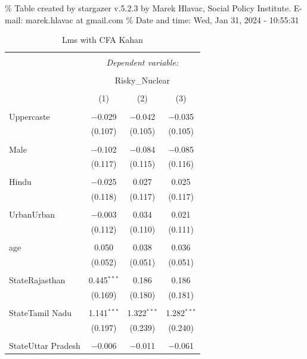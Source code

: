 \documentclass[
]{article}
\begin{document}
\begingroup\setlength{\tabcolsep}{1pt}

\renewcommand{\arraystretch}{0.7}

\% Table created by stargazer v.5.2.3 by Marek Hlavac, Social Policy
Institute. E-mail: marek.hlavac at gmail.com \% Date and time: Wed, Jan
31, 2024 - 10:55:31

\begin{table}[!htbp] \centering 
  \caption{Lms with CFA Kahan} 
  \label{} 
\begin{tabular}{@{\extracolsep{5pt}}lccc} 
\\[-1.8ex]\hline 
\hline \\[-1.8ex] 
 & \multicolumn{3}{c}{\textit{Dependent variable:}} \\ 
\cline{2-4} 
\\[-1.8ex] & \multicolumn{3}{c}{Risky\_Nuclear} \\ 
\\[-1.8ex] & (1) & (2) & (3)\\ 
\hline \\[-1.8ex] 
 Uppercaste & $-$0.029 & $-$0.042 & $-$0.035 \\ 
  & (0.107) & (0.105) & (0.105) \\ 
  & & & \\ 
 Male & $-$0.102 & $-$0.084 & $-$0.085 \\ 
  & (0.117) & (0.115) & (0.116) \\ 
  & & & \\ 
 Hindu & $-$0.025 & 0.027 & 0.025 \\ 
  & (0.118) & (0.117) & (0.117) \\ 
  & & & \\ 
 UrbanUrban & $-$0.003 & 0.034 & 0.021 \\ 
  & (0.112) & (0.110) & (0.111) \\ 
  & & & \\ 
 age & 0.050 & 0.038 & 0.036 \\ 
  & (0.052) & (0.051) & (0.051) \\ 
  & & & \\ 
 StateRajasthan & 0.445$^{***}$ & 0.186 & 0.186 \\ 
  & (0.169) & (0.180) & (0.181) \\ 
  & & & \\ 
 StateTamil Nadu & 1.141$^{***}$ & 1.322$^{***}$ & 1.282$^{***}$ \\ 
  & (0.197) & (0.239) & (0.240) \\ 
  & & & \\ 
 StateUttar Pradesh & $-$0.006 & $-$0.011 & $-$0.061 \\ 

\end{tabular}
\end{table}
\end{document}
